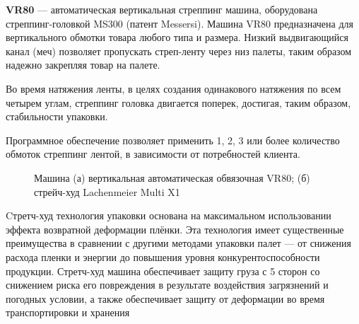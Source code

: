 \textbf{VR80} --- автоматическая вертикальная стреппинг машина, оборудована стреппинг-головкой MS300 (патент Messersi). Машина VR80 предназначена для вертикального обмотки товара любого типа и размера. Низкий выдвигающийся канал (меч) позволяет пропускать стреп-ленту через низ палеты, таким образом надежно закрепляя товар на палете. 

Во время натяжения ленты, в целях создания одинакового натяжения по всем четырем углам, стреппинг головка двигается поперек, достигая, таким образом, стабильности упаковки.

Программное обеспечение позволяет применить 1, 2, 3 или более количество обмоток стреппинг лентой, в зависимости от потребностей клиента.

\begin{figure}[ht]
    \qquad
    \caption{Машина (а) вертикальная автоматическая обвязочная VR80; (б) стрейч-худ Lachenmeier Multi X1}
    \label{fig:vr80x1}
\end{figure}

Cтретч-худ технология упаковки основана на максимальном использовании эффекта возвратной деформации плёнки. Эта технология имеет существенные преимущества в сравнении с другими методами упаковки палет --- от снижения расхода пленки и энергии до повышения уровня конкурентоспособности продукции. Стретч-худ машина обеспечивает защиту груза с 5 сторон со снижением риска его повреждения в результате воздействия загрязнений и погодных условии, а также обеспечивает защиту от деформации во время транспортировки и хранения

